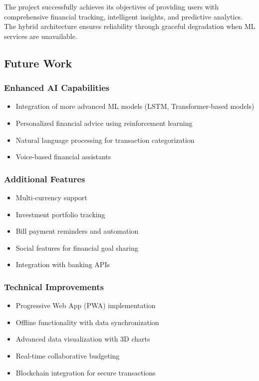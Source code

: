 \documentclass[12pt,a4paper]{article}
\begin{document}
The project successfully achieves its objectives of providing users with comprehensive financial tracking, intelligent insights, and predictive analytics. The hybrid architecture ensures reliability through graceful degradation when ML services are unavailable.

\subsection{Future Work}

\subsubsection{Enhanced AI Capabilities}
\begin{itemize}
    \item Integration of more advanced ML models (LSTM, Transformer-based models)
    \item Personalized financial advice using reinforcement learning
    \item Natural language processing for transaction categorization
    \item Voice-based financial assistants
\end{itemize}

\subsubsection{Additional Features}
\begin{itemize}
    \item Multi-currency support
    \item Investment portfolio tracking
    \item Bill payment reminders and automation
    \item Social features for financial goal sharing
    \item Integration with banking APIs
\end{itemize}

\subsubsection{Technical Improvements}
\begin{itemize}
    \item Progressive Web App (PWA) implementation
    \item Offline functionality with data synchronization
    \item Advanced data visualization with 3D charts
    \item Real-time collaborative budgeting
    \item Blockchain integration for secure transactions
\end{itemize}
\end{document}
